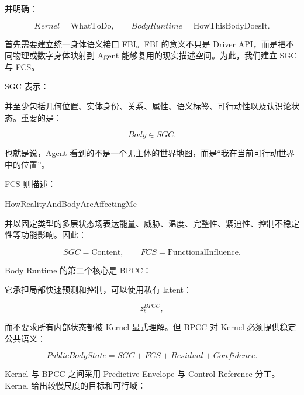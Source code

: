 \begin{statementbox}
\centering
{}
\end{statementbox}

并明确：

\[
Kernel=\mathrm{WhatToDo},
\qquad
BodyRuntime=\mathrm{HowThisBodyDoesIt}.
\]

首先需要建立统一身体语义接口 FBI。FBI 的意义不只是 Driver API，而是把不同物理或数字身体映射到 Agent 能够复用的现实描述空间。为此，我们建立 SGC 与 FCS。

SGC 表示：

\begin{statementbox}
\centering
{}
\end{statementbox}

并至少包括几何位置、实体身份、关系、属性、语义标签、可行动性以及认识论状态。重要的是：

\[
Body\in SGC.
\]

也就是说，Agent 看到的不是一个无主体的世界地图，而是“我在当前可行动世界中的位置”。

FCS 则描述：

\begin{statementbox}
HowRealityAndBodyAreAffectingMe
\end{statementbox}

并以固定类型的多层状态场表达能量、威胁、温度、完整性、紧迫性、控制不稳定性等功能影响。因此：

\[
SGC=\mathrm{Content},
\qquad
FCS=\mathrm{FunctionalInfluence}.
\]

Body Runtime 的第二个核心是 BPCC：

\begin{statementbox}
\centering
{}
\end{statementbox}

它承担局部快速预测和控制，可以使用私有 latent：

\[
z_t^{BPCC},
\]

而不要求所有内部状态都被 Kernel 显式理解。但 BPCC 对 Kernel 必须提供稳定公共语义：

\[
PublicBodyState
=
SGC+FCS+Residual+Confidence.
\]

Kernel 与 BPCC 之间采用 Predictive Envelope 与 Control Reference 分工。Kernel 给出较慢尺度的目标和可行域：

